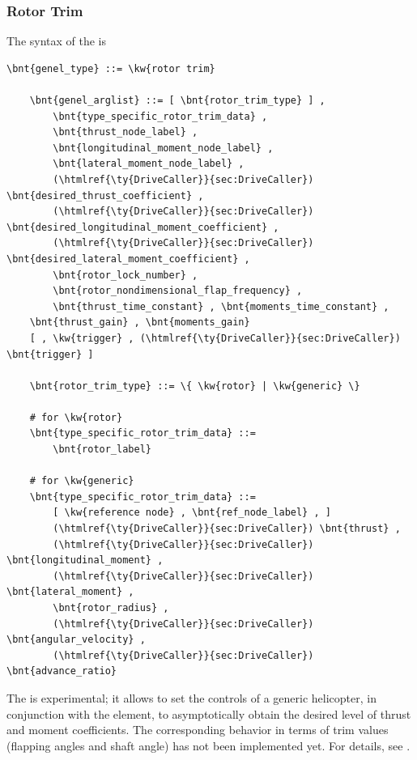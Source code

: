 \subsubsection{Rotor Trim}
\label{sec:EL:GENEL:ROTOR-TRIM}
The syntax of the  is
\begin{Verbatim}[commandchars=\\\{\}]
    \bnt{genel_type} ::= \kw{rotor trim}

    \bnt{genel_arglist} ::= [ \bnt{rotor_trim_type} ] ,
        \bnt{type_specific_rotor_trim_data} ,
        \bnt{thrust_node_label} ,
        \bnt{longitudinal_moment_node_label} ,
        \bnt{lateral_moment_node_label} ,
        (\htmlref{\ty{DriveCaller}}{sec:DriveCaller}) \bnt{desired_thrust_coefficient} ,
        (\htmlref{\ty{DriveCaller}}{sec:DriveCaller}) \bnt{desired_longitudinal_moment_coefficient} ,
        (\htmlref{\ty{DriveCaller}}{sec:DriveCaller}) \bnt{desired_lateral_moment_coefficient} ,
        \bnt{rotor_lock_number} ,
        \bnt{rotor_nondimensional_flap_frequency} ,
        \bnt{thrust_time_constant} , \bnt{moments_time_constant} ,
	\bnt{thrust_gain} , \bnt{moments_gain}
	[ , \kw{trigger} , (\htmlref{\ty{DriveCaller}}{sec:DriveCaller}) \bnt{trigger} ]

    \bnt{rotor_trim_type} ::= \{ \kw{rotor} | \kw{generic} \}

    # for \kw{rotor}
    \bnt{type_specific_rotor_trim_data} ::=
        \bnt{rotor_label}

    # for \kw{generic}
    \bnt{type_specific_rotor_trim_data} ::=
        [ \kw{reference node} , \bnt{ref_node_label} , ]
        (\htmlref{\ty{DriveCaller}}{sec:DriveCaller}) \bnt{thrust} ,
        (\htmlref{\ty{DriveCaller}}{sec:DriveCaller}) \bnt{longitudinal_moment} ,
        (\htmlref{\ty{DriveCaller}}{sec:DriveCaller}) \bnt{lateral_moment} ,
        \bnt{rotor_radius} ,
        (\htmlref{\ty{DriveCaller}}{sec:DriveCaller}) \bnt{angular_velocity} ,
        (\htmlref{\ty{DriveCaller}}{sec:DriveCaller}) \bnt{advance_ratio}
\end{Verbatim}
The  is experimental; it allows to set the controls 
of a generic helicopter, in conjunction with the 
element, to asymptotically obtain the desired level of thrust and
moment coefficients.
The corresponding behavior in terms of trim values (flapping angles
and shaft angle) has not been implemented yet.
For details, see \cite{PETERS-TRIM90}.







